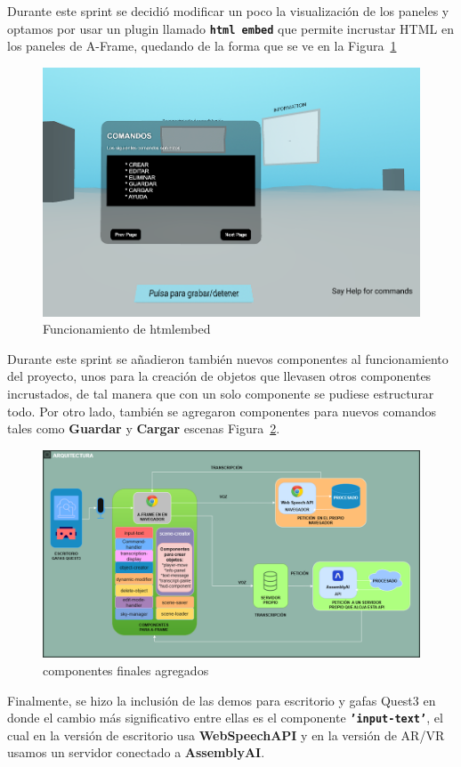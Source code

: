 \documentclass[a4paper, 12pt]{book}
\begin{document}
Durante este sprint se decidió modificar un poco la visualización de los paneles y optamos por usar un plugin llamado \texttt{\textbf{html embed}} que permite incrustar HTML en los paneles de A-Frame, quedando de la forma que se ve en la Figura~\ref{fig:htmlembed}
  \begin{figure}[H]  %
    \centering
    \includegraphics[width=0.4\linewidth]{img/htmlembed.png}  %
    \caption{Funcionamiento de htmlembed}  %
    \label{fig:htmlembed}  %
  \end{figure} 
Durante este sprint se añadieron también nuevos componentes al funcionamiento del proyecto, unos para la creación de objetos que llevasen otros componentes incrustados, de tal manera que con un solo componente se pudiese estructurar todo. 
Por otro lado, también se agregaron componentes para nuevos comandos tales como \textbf{Guardar} y \textbf{Cargar} escenas Figura~\ref{fig:componentes5}.
  \begin{figure}[H]  %
    \centering
    \includegraphics[width=0.6\linewidth]{img/componentes5.png}  %
    \caption{componentes finales agregados}  %
    \label{fig:componentes5}  %
  \end{figure} 
Finalmente, se hizo la inclusión de las demos para escritorio y gafas Quest3 en donde el cambio más significativo entre ellas es el componente \texttt{\textbf{'input-text'}}, el cual en la versión de escritorio usa \textbf{WebSpeechAPI} y en la versión de AR/VR usamos un servidor conectado a \textbf{AssemblyAI}.
\end{document}
